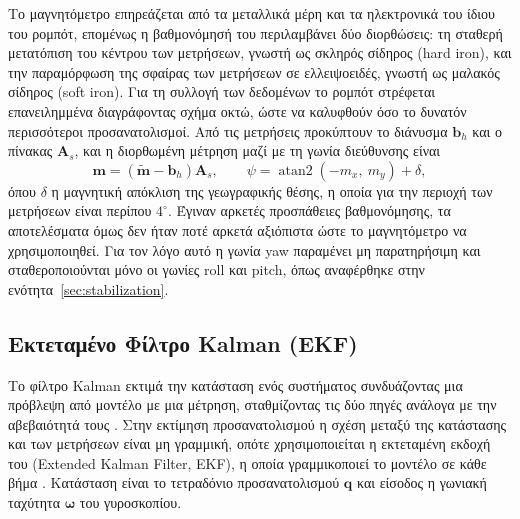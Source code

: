 \documentclass[11pt]{report}
\begin{document}
Το μαγνητόμετρο επηρεάζεται από τα μεταλλικά μέρη και τα ηλεκτρονικά του ίδιου
του ρομπότ, επομένως η βαθμονόμησή του περιλαμβάνει δύο διορθώσεις: τη σταθερή
μετατόπιση του κέντρου των μετρήσεων, γνωστή ως σκληρός σίδηρος (hard iron), και
την παραμόρφωση της σφαίρας των μετρήσεων σε ελλειψοειδές, γνωστή ως μαλακός
σίδηρος (soft iron). Για τη συλλογή των δεδομένων το ρομπότ στρέφεται
επανειλημμένα διαγράφοντας σχήμα οκτώ, ώστε να καλυφθούν όσο το δυνατόν
περισσότεροι προσανατολισμοί. Από τις μετρήσεις προκύπτουν το διάνυσμα
$\mathbf{b}_h$ και ο πίνακας $\mathbf{A}_s$, και η διορθωμένη μέτρηση μαζί με τη
γωνία διεύθυνσης είναι
\begin{equation}
\mathbf{m} = \left(\tilde{\mathbf{m}} - \mathbf{b}_h\right) \mathbf{A}_s,
\qquad
\psi = \operatorname{atan2}\!\left(-m_x,\ m_y\right) + \delta,
\label{eq:mag-calib}
\end{equation}
όπου $\delta$ η μαγνητική απόκλιση της γεωγραφικής θέσης, η οποία για την
περιοχή των μετρήσεων είναι περίπου $4^\circ$. Έγιναν αρκετές προσπάθειες
βαθμονόμησης, τα αποτελέσματα όμως δεν ήταν ποτέ αρκετά αξιόπιστα ώστε το
μαγνητόμετρο να χρησιμοποιηθεί. Για τον λόγο αυτό η γωνία yaw παραμένει μη
παρατηρήσιμη και σταθεροποιούνται μόνο οι γωνίες roll και pitch, όπως
αναφέρθηκε στην ενότητα~\ref{sec:stabilization}.

\subsection{Εκτεταμένο Φίλτρο Kalman (EKF)}
\label{subsec:ekf}
Το φίλτρο Kalman εκτιμά την κατάσταση ενός συστήματος συνδυάζοντας μια πρόβλεψη
από μοντέλο με μια μέτρηση, σταθμίζοντας τις δύο πηγές ανάλογα με την
αβεβαιότητά τους \cite{kalman_new_1960}. Στην εκτίμηση προσανατολισμού η σχέση
μεταξύ της κατάστασης και των μετρήσεων είναι μη γραμμική, οπότε χρησιμοποιείται
η εκτεταμένη εκδοχή του (Extended Kalman Filter, EKF), η οποία γραμμικοποιεί το
μοντέλο σε κάθε βήμα \cite{sabatini_kalmanfilterbased_2011,
palanisamy_filtering_2016}. Κατάσταση είναι το τετραδόνιο προσανατολισμού
$\mathbf{q}$ και είσοδος η γωνιακή ταχύτητα $\boldsymbol{\omega}$ του
γυροσκοπίου.
\end{document}
